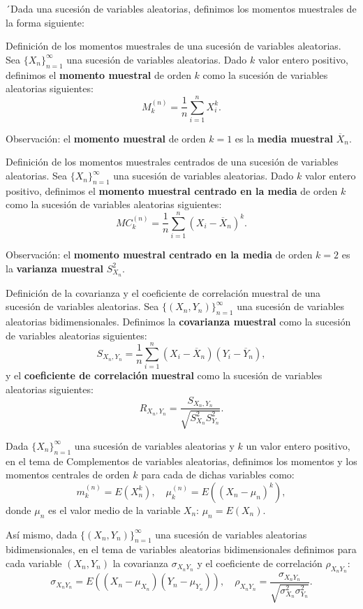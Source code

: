\documentclass[]{book}
\begin{document}
´Dada una sucesión de variables aleatorias, definimos los momentos muestrales de la forma siguiente:

Definición de los momentos muestrales de una sucesión de variables aleatorias.
Sea \(\{X_n\}_{n=1}^\infty\) una sucesión de variables aleatorias. Dado \(k\) valor entero positivo, definimos el \textbf{momento muestral} de orden \(k\) como la sucesión de variables aleatorias siguientes:
\[
M_k^{(n)} = \frac{1}{n}\sum_{i=1}^n X_i^k.
\]

Observación:
el \textbf{momento muestral} de orden \(k=1\) es la \textbf{media muestral} \(\overline{X}_n\).

Definición de los momentos muestrales centrados de una sucesión de variables aleatorias.
Sea \(\{X_n\}_{n=1}^\infty\) una sucesión de variables aleatorias. Dado \(k\) valor entero positivo, definimos el \textbf{momento muestral centrado en la media} de orden \(k\) como la sucesión de variables aleatorias siguientes:
\[
MC_k^{(n)} = \frac{1}{n}\sum_{i=1}^n (X_i-\overline{X}_n)^k.
\]

Observación:
el \textbf{momento muestral centrado en la media} de orden \(k=2\) es la \textbf{varianza muestral} \(S_{X_n}^2\).

Definición de la covarianza y el coeficiente de correlación muestral de una sucesión de variables aleatorias.
Sea \(\{(X_n,Y_n)\}_{n=1}^\infty\) una sucesión de variables aleatorias bidimensionales. Definimos la \textbf{covarianza muestral} como la sucesión de variables aleatorias siguientes:
\[
S_{X_n,Y_n} = \frac{1}{n}\sum_{i=1}^n (X_i-\overline{X}_n)(Y_i-\overline{Y}_n),
\]
y el \textbf{coeficiente de correlación muestral} como la sucesión de variables aleatorias siguientes:
\[
R_{X_n,Y_n}=\frac{S_{X_n,Y_n}}{\sqrt{S_{X_n}^2 S_{Y_n}^2}}.
\]

Dada \(\{X_n\}_{n=1}^\infty\) una sucesión de variables aleatorias y \(k\) un valor entero positivo, en el tema de Complementos de variables aleatorias, definimos los momentos y los momentos centrales de orden \(k\) para cada de dichas variables como:
\[
m_k^{(n)} = E\left(X_n^k\right),\quad\mu_k^{(n)}=E\left(\left(X_n-\mu_n\right)^k\right),
\]
donde \(\mu_n\) es el valor medio de la variable \(X_n\): \(\mu_n = E(X_n)\).

Así mismo, dada \(\{(X_n,Y_n)\}_{n=1}^\infty\) una sucesión de variables aleatorias bidimensionales, en el tema de variables aleatorias bidimensionales definimos para cada variable \((X_n,Y_n)\) la covarianza \(\sigma_{X_nY_n}\) y el coeficiente de correlación \(\rho_{X_nY_n}\):
\[
\sigma_{X_nY_n}=E((X_n-\mu_{X_n})(Y_n-\mu_{Y_n})),\quad \rho_{X_nY_n}=\frac{\sigma_{X_nY_n}}{\sqrt{\sigma_{X_n}^2\sigma_{Y_n}^2}}.
\]
\end{document}
